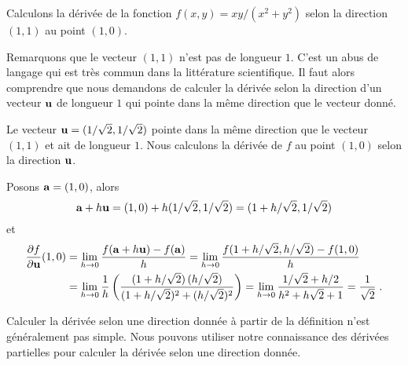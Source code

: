 {


\begin{egg}
Calculons la dérivée de la fonction $f(x,y) = xy/(x^2+y^2)$ selon la
direction $(1,1)$ au point $(1,0)$.

Remarquons que le vecteur $(1,1)$ n'est pas de longueur $1$.  C'est un abus
de langage qui est très commun dans la littérature scientifique.  Il faut
alors comprendre que nous demandons de calculer la dérivée selon la direction
d'un vecteur $\mathbf{u}$ de longueur $1$ qui pointe dans la même direction que
le vecteur donné.

Le vecteur $\mathbf{u} = (1/\sqrt{2},1/\sqrt{2})$ pointe dans la
même direction que le vecteur $(1,1)$ et ait de longueur $1$.  Nous
calculons la dérivée de $f$ au point $(1,0)$ selon la direction $\mathbf{u}$.

Posons $\mathbf{a} = (1,0)$, alors
\[
\mathbf{a}+h\mathbf{u} = (1,0)+h(1/\sqrt{2},1/\sqrt{2}) =
(1+h/\sqrt{2},1/\sqrt{2})
\]
et 
\begin{align*}
\frac{\partial f}{\partial \mathbf{u}}(1,0) &=
\lim_{h\rightarrow 0} \frac{f(\mathbf{a}+h\mathbf{u}) - f(\mathbf{a})}{h} 
= \lim_{h\rightarrow 0} \frac{f(1+h/\sqrt{2},h/\sqrt{2})-f(1,0)}{h} \\
&= \lim_{h\rightarrow 0} \frac{1}{h}
\left(\frac{(1+h/\sqrt{2})\,(h/\sqrt{2})}
{(1+h/\sqrt{2})^2 +(h/\sqrt{2})^2} \right)
= \lim_{h\rightarrow 0} \frac{1/\sqrt{2}+h/2} {h^2+h\sqrt{2}+1}
= \frac{1}{\sqrt{2}} \; .
\end{align*}
\end{egg}

Calculer la dérivée selon une direction donnée à partir de la définition
n'est généralement pas simple.  Nous pouvons utiliser notre
connaissance des dérivées partielles pour calculer la dérivée selon
une direction donnée.

}
